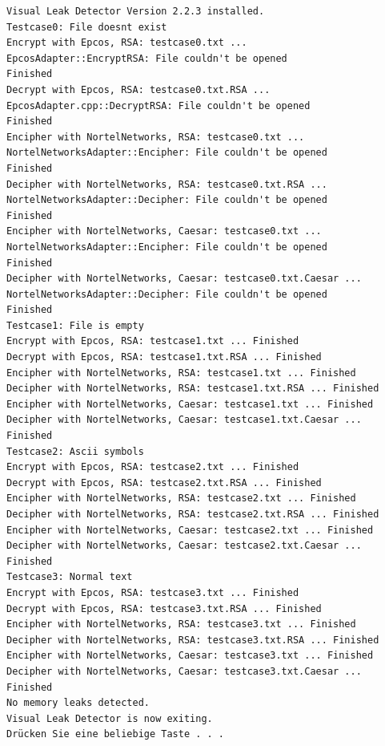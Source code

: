 \documentclass[12pt,a4paper]{article}
\begin{document}
\begin {verbatim}
Visual Leak Detector Version 2.2.3 installed.
Testcase0: File doesnt exist
Encrypt with Epcos, RSA: testcase0.txt ...
EpcosAdapter::EncryptRSA: File couldn't be opened
Finished
Decrypt with Epcos, RSA: testcase0.txt.RSA ... 
EpcosAdapter.cpp::DecryptRSA: File couldn't be opened
Finished
Encipher with NortelNetworks, RSA: testcase0.txt ... 
NortelNetworksAdapter::Encipher: File couldn't be opened
Finished
Decipher with NortelNetworks, RSA: testcase0.txt.RSA ... 
NortelNetworksAdapter::Decipher: File couldn't be opened
Finished
Encipher with NortelNetworks, Caesar: testcase0.txt ... 
NortelNetworksAdapter::Encipher: File couldn't be opened
Finished
Decipher with NortelNetworks, Caesar: testcase0.txt.Caesar ...
NortelNetworksAdapter::Decipher: File couldn't be opened
Finished
Testcase1: File is empty
Encrypt with Epcos, RSA: testcase1.txt ... Finished
Decrypt with Epcos, RSA: testcase1.txt.RSA ... Finished
Encipher with NortelNetworks, RSA: testcase1.txt ... Finished
Decipher with NortelNetworks, RSA: testcase1.txt.RSA ... Finished
Encipher with NortelNetworks, Caesar: testcase1.txt ... Finished
Decipher with NortelNetworks, Caesar: testcase1.txt.Caesar ... Finished
Testcase2: Ascii symbols
Encrypt with Epcos, RSA: testcase2.txt ... Finished
Decrypt with Epcos, RSA: testcase2.txt.RSA ... Finished
Encipher with NortelNetworks, RSA: testcase2.txt ... Finished
Decipher with NortelNetworks, RSA: testcase2.txt.RSA ... Finished
Encipher with NortelNetworks, Caesar: testcase2.txt ... Finished
Decipher with NortelNetworks, Caesar: testcase2.txt.Caesar ... Finished
Testcase3: Normal text
Encrypt with Epcos, RSA: testcase3.txt ... Finished
Decrypt with Epcos, RSA: testcase3.txt.RSA ... Finished
Encipher with NortelNetworks, RSA: testcase3.txt ... Finished
Decipher with NortelNetworks, RSA: testcase3.txt.RSA ... Finished
Encipher with NortelNetworks, Caesar: testcase3.txt ... Finished
Decipher with NortelNetworks, Caesar: testcase3.txt.Caesar ... Finished
No memory leaks detected.
Visual Leak Detector is now exiting.
Drücken Sie eine beliebige Taste . . .
\end {verbatim}
\end{document}
